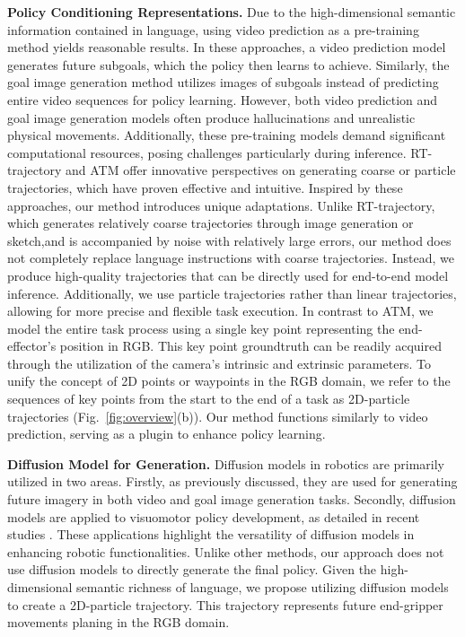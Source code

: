\textbf{Policy Conditioning Representations.}
Due to the high-dimensional semantic information contained in language, using video prediction as a pre-training method \cite{du2024learning,escontrela2024video} yields reasonable results. In these approaches, a video prediction model generates future subgoals, which the policy then learns to achieve. Similarly, the goal image generation method \cite{black2023zero} utilizes images of subgoals instead of predicting entire video sequences for policy learning. However, both video prediction and goal image generation models often produce hallucinations and unrealistic physical movements. Additionally, these pre-training models demand significant computational resources, posing challenges particularly during inference. 
RT-trajectory \cite{gu2023rt} and ATM \cite{wen2023any} offer innovative perspectives on generating coarse or particle trajectories, which have proven effective and intuitive. Inspired by these approaches, our method introduces unique adaptations. 
Unlike RT-trajectory, which generates relatively coarse trajectories through image generation or sketch,and is accompanied by noise with relatively large errors, our method does not completely replace language instructions with coarse trajectories. Instead, we produce high-quality trajectories that can be directly used for end-to-end model inference. Additionally, we use particle trajectories rather than linear trajectories, allowing for more precise and flexible task execution.
In contrast to ATM, we model the entire task process using a single key point representing the end-effector's position in RGB. This key point groundtruth can be readily acquired through the utilization of the camera's intrinsic and extrinsic parameters. To unify the concept of 2D points or waypoints in the RGB domain, we refer to the sequences of key points from the start to the end of a task as 2D-particle trajectories (Fig.~\ref{fig:overview}(b)). Our method functions similarly to video prediction, serving as a plugin to enhance policy learning.

\textbf{Diffusion Model for Generation.}
Diffusion models in robotics are primarily utilized in two areas. Firstly, as previously discussed, they are used for generating future imagery in both video and goal image generation tasks. Secondly, diffusion models are applied to visuomotor policy development, as detailed in recent studies \cite{chi2023diffusionpolicy, reuss2024multimodal, octo_2023}. These applications highlight the versatility of diffusion models in enhancing robotic functionalities. 
Unlike other methods, our approach does not use diffusion models to directly generate the final policy. Given the high-dimensional semantic richness of language, we propose utilizing diffusion models to create a 2D-particle trajectory. This trajectory represents future end-gripper movements planing in the RGB domain.

